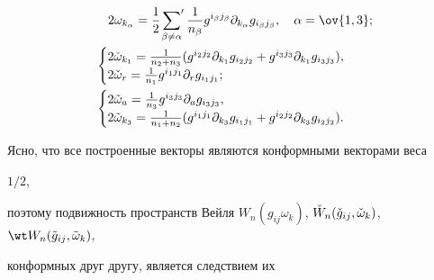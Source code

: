 \begin{align*} 


&\quad 2\omega_{k_\alpha}=\frac{1}{2}\sideset{}{'} 


\sum_{\beta\ne\alpha}\frac{1}{n_\beta} 


g^{i_\beta j_\beta}\partial_{k_\alpha} 


g_{i_\beta j_\beta},\quad \alpha=\ov{1,3}; \\ 


% 


& 


\begin{cases} 


2\Check\omega_{k_1}=\frac{1}{n_2+n_3}(g^{i_2j_2}\partial_{k_1} 


g_{i_2j_2}+g^{i_3j_3}\partial_{k_1}g_{i_3j_3}), \\ 


2\Check\omega_r=\frac{1}{n_1}g^{i_1j_1}\partial_r 


g_{i_1j_1}; 


\end{cases} 


\\


%


& 


\begin{cases} 


2\Tilde\omega_a=\frac{1}{n_3}g^{i_3j_3}\partial_a 


g_{i_3j_3}, \\ 


2\Tilde\omega_{k_3}=\frac{1}{n_1+n_2}(g^{i_1j_1}\partial_{k_3} 


g_{i_1j_1}+g^{i_2j_2}\partial_{k_3}g_{i_2j_2}). 


\end{cases} 


\end{align*} 


 


Ясно, что все построенные векторы являются конформными векторами веса 


$1/2$, 


поэтому подвижность пространств Вейля $W_n(g_{ij}\omega_k)$, $\Check 


W_n(\Check g_{ij},\Check \omega_k)$, $\wt W_n(\Tilde 


g_{ij},\Tilde\omega_k)$, 


конформных друг другу, является следствием их 


